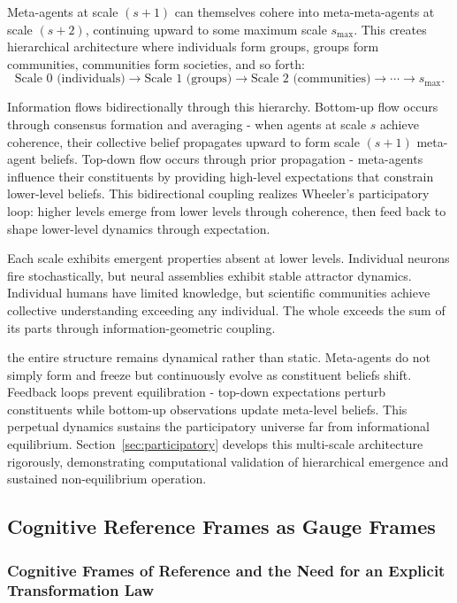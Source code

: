 \documentclass[11pt]{article}
\begin{document}
Meta-agents at scale $(s+1)$ can themselves cohere into meta-meta-agents at scale $(s+2)$, continuing upward to some maximum scale $s_{\max}$. This creates hierarchical architecture where individuals form groups, groups form communities, communities form societies, and so forth:
\begin{equation}
\text{Scale 0 (individuals)} \to \text{Scale 1 (groups)} \to \text{Scale 2 (communities)} \to \cdots \to s_{\max}.
\end{equation}

Information flows bidirectionally through this hierarchy. Bottom-up flow occurs through consensus formation and averaging - when agents at scale $s$ achieve coherence, their collective belief propagates upward to form scale $(s+1)$ meta-agent beliefs. Top-down flow occurs through prior propagation - meta-agents influence their constituents by providing high-level expectations that constrain lower-level beliefs. This bidirectional coupling realizes Wheeler's participatory loop: higher levels emerge from lower levels through coherence, then feed back to shape lower-level dynamics through expectation.

Each scale exhibits emergent properties absent at lower levels. Individual neurons fire stochastically, but neural assemblies exhibit stable attractor dynamics. Individual humans have limited knowledge, but scientific communities achieve collective understanding exceeding any individual. The whole exceeds the sum of its parts through information-geometric coupling.

the entire structure remains dynamical rather than static. Meta-agents do not simply form and freeze but continuously evolve as constituent beliefs shift. Feedback loops prevent equilibration - top-down expectations perturb constituents while bottom-up observations update meta-level beliefs. This perpetual dynamics sustains the participatory universe far from informational equilibrium. Section~\ref{sec:participatory} develops this multi-scale architecture rigorously, demonstrating computational validation of hierarchical emergence and sustained non-equilibrium operation.

\subsection{Cognitive Reference Frames as Gauge Frames}
\label{sec:cognitive_reference_frames}

\subsubsection{Cognitive Frames of Reference and the Need for an Explicit Transformation Law}
\end{document}
